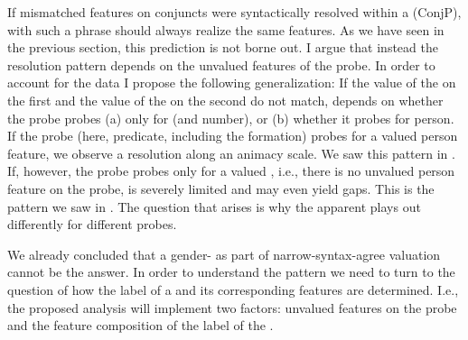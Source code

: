 \documentclass[output=paper,modfontsnewtxmath,hidelinks]{langscibook}
\begin{document}
If mismatched  features on conjuncts were syntactically resolved within a  (ConjP),  with such a phrase should always realize the same features. As we have seen in the previous section, this prediction is not borne out. I argue that instead the resolution pattern depends on the unvalued features of the probe. In order to account for the data I propose the following generalization: If the value of the  on the first  and the value of the  on the second  do not match,  depends on whether the probe probes (a) only for  (and number), or (b) whether it probes for person. If the probe (here,  predicate, including the  formation) probes for a valued person feature, we observe a resolution along an animacy scale. We saw this pattern in . If, however, the probe probes only for a valued , i.e., there is no unvalued person feature on the probe,  is severely limited and may even yield  gaps. This is the pattern we saw in . The question that arises is why the apparent  plays out differently for different probes.

We already concluded that a gender- as part of narrow-syn\-tax-agree valuation cannot be the answer. In order to understand the pattern we need to turn to the question of how the label of a  and its corresponding features are determined. I.e., the proposed analysis will implement two factors: unvalued features on the probe and the feature composition of the label of the . 
\end{document}
